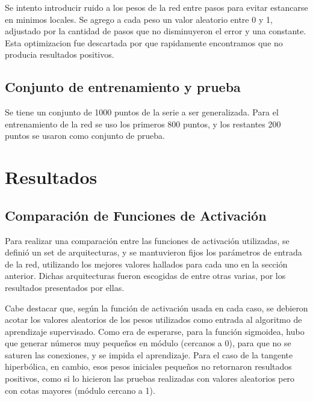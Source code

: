 \documentclass[a4paper,10pt]{article}
\begin{document}
        Se intento introducir ruido a los pesos de la red entre pasos para evitar estancarse en minimos locales.
        Se agrego a cada peso un valor aleatorio entre 0 y 1, adjustado por la cantidad de pasos que no disminuyeron el error y una constante.
        Esta optimizacion fue descartada por que rapidamente encontramos que no producia resultados positivos.

    \subsection{Conjunto de entrenamiento y prueba}

    Se tiene un conjunto de 1000 puntos de la serie a ser generalizada.
    Para el entrenamiento de la red se uso los primeros 800 puntos, y los restantes 200 puntos se usaron como conjunto de prueba.

\section{Resultados}

    \subsection{Comparación de Funciones de Activación}

    Para realizar una comparación entre las funciones de activación utilizadas, se definió un set de arquitecturas, y se mantuvieron fijos los parámetros de entrada de la red, 
    utilizando los mejores valores hallados para cada uno en la sección anterior. Dichas arquitecturas fueron escogidas de entre otras varias, por los resultados presentados por ellas.

    Cabe destacar que, según la función de activación usada en cada caso, se debieron acotar los valores aleatorios de los pesos utilizados como entrada al algoritmo de aprendizaje
    supervisado. Como era de esperarse, para la función sigmoidea, hubo que generar números muy pequeños en módulo (cercanos a 0), para que no se saturen las conexiones, y se impida el aprendizaje.
    Para el caso de la tangente hiperbólica, en cambio, esos pesos  iniciales pequeños no retornaron resultados positivos, como si lo hicieron las pruebas realizadas con valores 
    aleatorios pero con cotas mayores (módulo cercano a 1).
\end{document}
